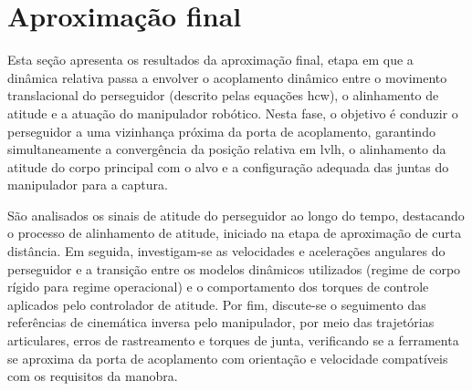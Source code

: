 \section{Aproximação final}
\label{sec:cap4_app_final}

Esta seção apresenta os resultados da aproximação final, etapa em que a dinâmica relativa passa a envolver o acoplamento dinâmico entre o movimento translacional do perseguidor (descrito pelas equações \gls{hcw}), o alinhamento de atitude e a atuação do manipulador robótico.
Nesta fase, o objetivo é conduzir o perseguidor a uma vizinhança próxima da porta de acoplamento, garantindo simultaneamente a convergência da posição relativa em \gls{lvlh}, o alinhamento da atitude do corpo principal com o alvo e a configuração adequada das juntas do manipulador para a captura.

São analisados os sinais de atitude do perseguidor ao longo do tempo, destacando o processo de alinhamento de atitude, iniciado na etapa de aproximação de curta distância.
Em seguida, investigam-se as velocidades e acelerações angulares do perseguidor e a transição entre os modelos dinâmicos utilizados (regime de corpo rígido para regime operacional) e o comportamento dos torques de controle aplicados pelo controlador de atitude.
Por fim, discute-se o seguimento das referências de cinemática inversa pelo manipulador, por meio das trajetórias articulares, erros de rastreamento e torques de junta, verificando se a ferramenta se aproxima da porta de acoplamento com orientação e velocidade compatíveis com os requisitos da manobra.







